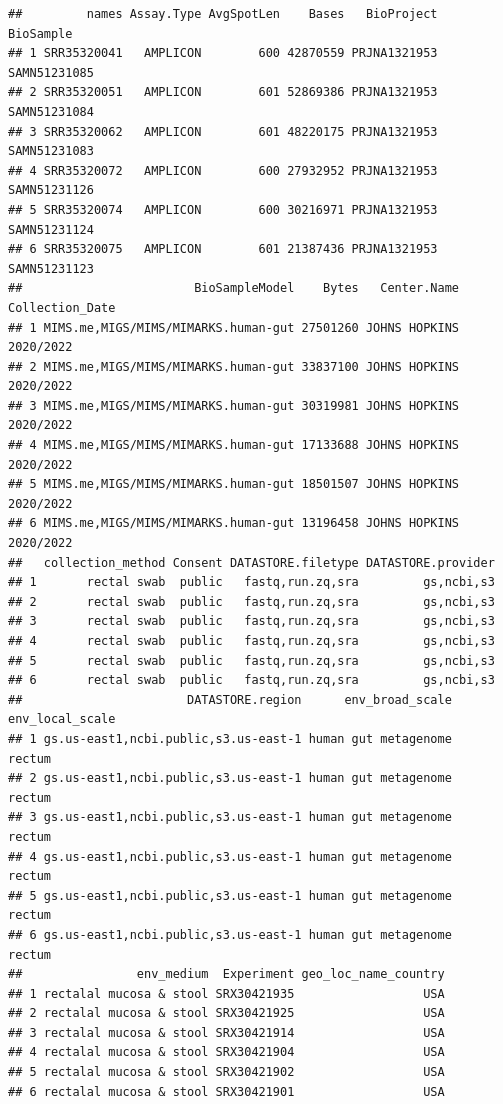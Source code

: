 \documentclass[
]{article}
\begin{document}
\begin{verbatim}
##         names Assay.Type AvgSpotLen    Bases   BioProject    BioSample
## 1 SRR35320041   AMPLICON        600 42870559 PRJNA1321953 SAMN51231085
## 2 SRR35320051   AMPLICON        601 52869386 PRJNA1321953 SAMN51231084
## 3 SRR35320062   AMPLICON        601 48220175 PRJNA1321953 SAMN51231083
## 4 SRR35320072   AMPLICON        600 27932952 PRJNA1321953 SAMN51231126
## 5 SRR35320074   AMPLICON        600 30216971 PRJNA1321953 SAMN51231124
## 6 SRR35320075   AMPLICON        601 21387436 PRJNA1321953 SAMN51231123
##                        BioSampleModel    Bytes   Center.Name Collection_Date
## 1 MIMS.me,MIGS/MIMS/MIMARKS.human-gut 27501260 JOHNS HOPKINS       2020/2022
## 2 MIMS.me,MIGS/MIMS/MIMARKS.human-gut 33837100 JOHNS HOPKINS       2020/2022
## 3 MIMS.me,MIGS/MIMS/MIMARKS.human-gut 30319981 JOHNS HOPKINS       2020/2022
## 4 MIMS.me,MIGS/MIMS/MIMARKS.human-gut 17133688 JOHNS HOPKINS       2020/2022
## 5 MIMS.me,MIGS/MIMS/MIMARKS.human-gut 18501507 JOHNS HOPKINS       2020/2022
## 6 MIMS.me,MIGS/MIMS/MIMARKS.human-gut 13196458 JOHNS HOPKINS       2020/2022
##   collection_method Consent DATASTORE.filetype DATASTORE.provider
## 1       rectal swab  public   fastq,run.zq,sra         gs,ncbi,s3
## 2       rectal swab  public   fastq,run.zq,sra         gs,ncbi,s3
## 3       rectal swab  public   fastq,run.zq,sra         gs,ncbi,s3
## 4       rectal swab  public   fastq,run.zq,sra         gs,ncbi,s3
## 5       rectal swab  public   fastq,run.zq,sra         gs,ncbi,s3
## 6       rectal swab  public   fastq,run.zq,sra         gs,ncbi,s3
##                       DATASTORE.region      env_broad_scale env_local_scale
## 1 gs.us-east1,ncbi.public,s3.us-east-1 human gut metagenome          rectum
## 2 gs.us-east1,ncbi.public,s3.us-east-1 human gut metagenome          rectum
## 3 gs.us-east1,ncbi.public,s3.us-east-1 human gut metagenome          rectum
## 4 gs.us-east1,ncbi.public,s3.us-east-1 human gut metagenome          rectum
## 5 gs.us-east1,ncbi.public,s3.us-east-1 human gut metagenome          rectum
## 6 gs.us-east1,ncbi.public,s3.us-east-1 human gut metagenome          rectum
##                env_medium  Experiment geo_loc_name_country
## 1 rectalal mucosa & stool SRX30421935                  USA
## 2 rectalal mucosa & stool SRX30421925                  USA
## 3 rectalal mucosa & stool SRX30421914                  USA
## 4 rectalal mucosa & stool SRX30421904                  USA
## 5 rectalal mucosa & stool SRX30421902                  USA
## 6 rectalal mucosa & stool SRX30421901                  USA

\end{verbatim}
\end{document}
